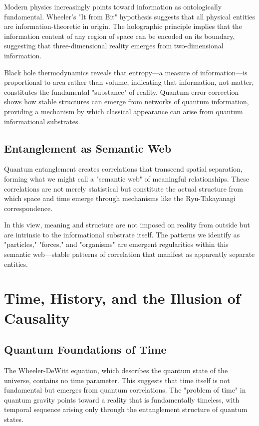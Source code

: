 \documentclass[12pt]{article}
\begin{document}
Modern physics increasingly points toward information as ontologically fundamental. Wheeler's "It from Bit" hypothesis suggests that all physical entities are information-theoretic in origin. The holographic principle implies that the information content of any region of space can be encoded on its boundary, suggesting that three-dimensional reality emerges from two-dimensional information.

Black hole thermodynamics reveals that entropy—a measure of information—is proportional to area rather than volume, indicating that information, not matter, constitutes the fundamental "substance" of reality. Quantum error correction shows how stable structures can emerge from networks of quantum information, providing a mechanism by which classical appearance can arise from quantum informational substrates.

\subsection{Entanglement as Semantic Web}

Quantum entanglement creates correlations that transcend spatial separation, forming what we might call a "semantic web" of meaningful relationships. These correlations are not merely statistical but constitute the actual structure from which space and time emerge through mechanisms like the Ryu-Takayanagi correspondence.

In this view, meaning and structure are not imposed on reality from outside but are intrinsic to the informational substrate itself. The patterns we identify as "particles," "forces," and "organisms" are emergent regularities within this semantic web—stable patterns of correlation that manifest as apparently separate entities.

\section{Time, History, and the Illusion of Causality}

\subsection{Quantum Foundations of Time}

The Wheeler-DeWitt equation, which describes the quantum state of the universe, contains no time parameter. This suggests that time itself is not fundamental but emerges from quantum correlations. The "problem of time" in quantum gravity points toward a reality that is fundamentally timeless, with temporal sequence arising only through the entanglement structure of quantum states.
\end{document}
